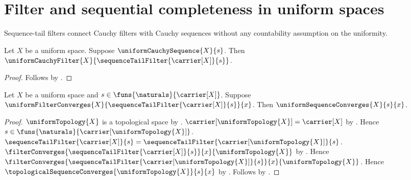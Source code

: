 


\section{Filter and sequential completeness in uniform spaces}

Sequence-tail filters connect Cauchy filters with Cauchy sequences without
any countability assumption on the uniformity.

\begin{theorem}\label{uniform_cauchy_sequence_tail_filter}
    Let $X$ be a uniform space.
    Suppose $\uniformCauchySequence{X}{s}$.
    Then $\uniformCauchyFilter{X}
        {\sequenceTailFilter{\carrier[X]}{s}}$.
\end{theorem}
\begin{proof}
    Follows by .
\end{proof}

\begin{theorem}\label{tail_filter_convergence_implies_sequence_convergence}
    Let $X$ be a uniform space and
        $s\in\funs{\naturals}{\carrier[X]}$.
    Suppose
        $\uniformFilterConverges{X}
            {\sequenceTailFilter{\carrier[X]}{s}}{x}$.
    Then $\uniformSequenceConverges{X}{s}{x}$.
\end{theorem}
\begin{proof}
    $\uniformTopology{X}$ is a topological space
        by .
    $\carrier[\uniformTopology{X}]=\carrier[X]$
        by .
    Hence $s\in\funs{\naturals}{\carrier[\uniformTopology{X}]}$.
    $\sequenceTailFilter{\carrier[X]}{s}=
        \sequenceTailFilter{\carrier[\uniformTopology{X}]}{s}$.
    $\filterConverges{\sequenceTailFilter{\carrier[X]}{s}}{x}
        {\uniformTopology{X}}$ by .
    Hence $\filterConverges{
            \sequenceTailFilter{\carrier[\uniformTopology{X}]}{s}}{x}
        {\uniformTopology{X}}$.
    Hence $\topologicalSequenceConverges{\uniformTopology{X}}{s}{x}$ by
        .
    Follows by .
\end{proof}

